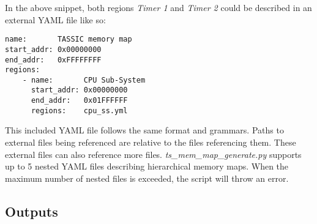 \documentclass{tropic_design_spec}
\begin{document}
In the above snippet, both regions \textit{Timer 1} and \textit{Timer 2} could be described
in an external YAML file like so:

\begin{lstlisting}
name:       TASSIC memory map
start_addr: 0x00000000
end_addr:   0xFFFFFFFF
regions:
    - name:       CPU Sub-System
      start_addr: 0x00000000
      end_addr:   0x01FFFFFF
      regions:    cpu_ss.yml
\end{lstlisting}

This included YAML file follows the same format and grammars. Paths to external files being
referenced are relative to the files referencing them. These external files can also reference
more files. \textit{ts_mem_map_generate.py} supports up to 5 nested YAML files describing
hierarchical memory maps. When the maximum number of nested files is exceeded, the script
will throw an error.

\pagebreak
\subsection{Outputs}

\pagebreak
\PrintOpenIssueSummary
\end{document}
